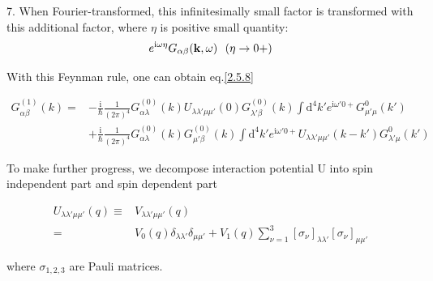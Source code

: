 7. When Fourier-transformed, this infinitesimally small factor is transformed with this additional factor, where $\eta$ is positive small quantity:
$$e^{\mathrm{i}\omega\eta}G_{\alpha\beta}({\bf k},\omega) \ \ (\eta\rightarrow0+)$$

With this Feynman rule, one can obtain eq.\eqref{2.5.8}

\begin{align}
G_{\alpha\beta}^{(1)}(k)=&-\frac{\mathrm{i}}{\hbar}\frac{1}{(2\pi)^4} G_{\alpha\lambda}^{(0)}(k)U_{\lambda\lambda'\mu\mu'}(0)G_{\lambda'\beta}^{(0)}(k)\int \mathrm{d}^4k'e^{\mathrm{i}\omega'0+}G_{\mu'\mu}^0(k') \nonumber \\
&+\frac{\mathrm{i}}{\hbar}\frac{1}{(2\pi)^4} G_{\alpha\lambda}^{(0)}(k)G_{\mu'\beta}^{(0)}(k)\int \mathrm{d}^4k'e^{\mathrm{i}\omega'0+}U_{\lambda\lambda'\mu\mu'}(k-k')G_{\lambda'\mu}^0(k') \nonumber
\end{align}

To make further progress, we decompose interaction potential U into spin independent part and spin dependent part 

\begin{align}
U_{\lambda\lambda'\mu\mu'}(q)\equiv& V_{\lambda\lambda'\mu\mu'}(q) \nonumber \\
=& V_0(q) \delta_{\lambda\lambda'}\delta_{\mu\mu'}+V_1(q)\sum_{\nu=1}^{3}[\sigma_{\nu}]_{\lambda\lambda'}[\sigma_{\nu}]_{\mu\mu'} \nonumber
\end{align}

where $\sigma_{1,2,3}$ are Pauli matrices.

